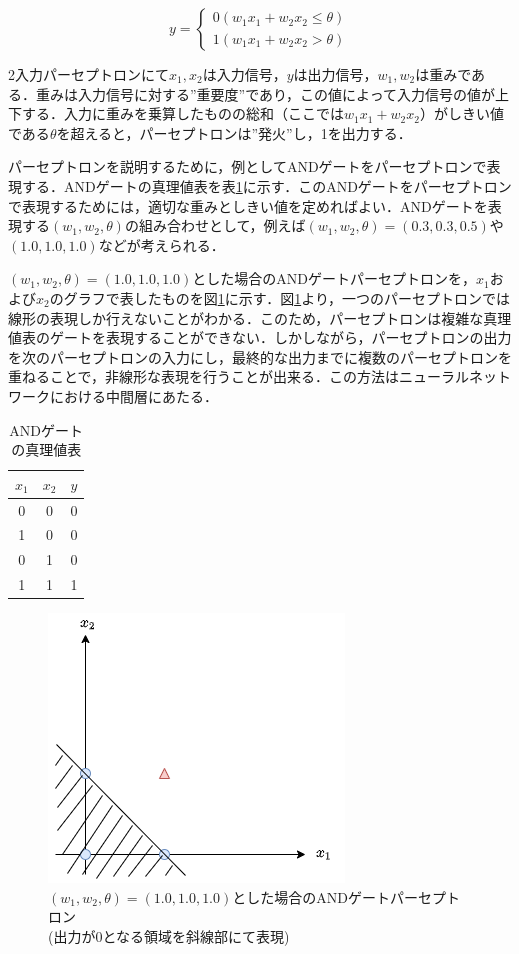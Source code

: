 \documentclass[a4j, 11pt]{jreport}
\begin{document}
\begin{equation}
y= \left \{
\begin{array}{l}
0　(w_1x_1 + w_2x_2 \leq \theta)\\
1　(w_1x_1 + w_2x_2 > \theta)
\end{array}
\right.
\label{eq:pa-septoron}
\end{equation}

2入力パーセプトロンにて$x_1, x_2$は入力信号，$y$は出力信号，$w_1, w_2$は重みである．重みは入力信号に対する''重要度''であり，この値によって入力信号の値が上下する．入力に重みを乗算したものの総和（ここでは$w_1x_1 + w_2x_2$）がしきい値である$\theta$を超えると，パーセプトロンは''発火''し，1を出力する．

パーセプトロンを説明するために，例としてANDゲートをパーセプトロンで表現する．ANDゲートの真理値表を表\ref{tb:and_gate}に示す．このANDゲートをパーセプトロンで表現するためには，適切な重みとしきい値を定めればよい．ANDゲートを表現する$(w_1, w_2, \theta)$の組み合わせとして，例えば$(w_1, w_2, \theta) = (0.3, 0.3, 0.5)$や$(1.0, 1.0, 1.0)$などが考えられる．

$(w_1, w_2, \theta) = (1.0, 1.0, 1.0)$とした場合のANDゲートパーセプトロンを，$x_1$および$x_2$のグラフで表したものを図\ref{fig:pa-septoron_graph}に示す．図\ref{fig:pa-septoron_graph}より，一つのパーセプトロンでは線形の表現しか行えないことがわかる．このため，パーセプトロンは複雑な真理値表のゲートを表現することができない．しかしながら，パーセプトロンの出力を次のパーセプトロンの入力にし，最終的な出力までに複数のパーセプトロンを重ねることで，非線形な表現を行うことが出来る．この方法はニューラルネットワークにおける中間層にあたる．

\begin{table}[H]
  \centering
	\caption{ANDゲートの真理値表}
  \begin{tabular}{cc|c}
    $x_1$ & $x_2$ & $y$ \\ \hline
    0 & 0 & 0 \\ 
    1 & 0 & 0 \\
    0 & 1 & 0 \\
    1 & 1 & 1 \\
  \end{tabular}
  \label{tb:and_gate}
\end{table}

\begin{figure}[H]
 \centering
 \includegraphics[width=0.5\hsize, keepaspectratio]{images/drawio/pa-seputoron_graph.png}
 \caption{$(w_1, w_2, \theta) = (1.0, 1.0, 1.0)$とした場合のANDゲートパーセプトロン\\(出力が0となる領域を斜線部にて表現)}
 \label{fig:pa-septoron_graph}
\end{figure}
\end{document}
